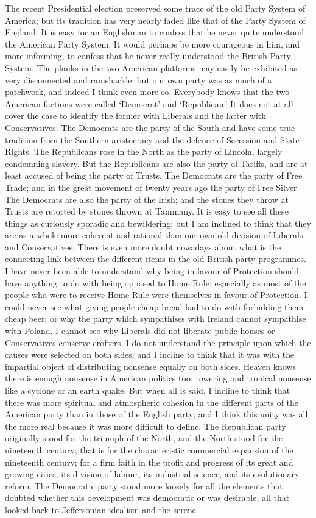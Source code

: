 \documentclass{book}
\begin{document}
The recent Presidential election preserved some trace of the old Party System of America; but its tradition has very nearly faded like that of the Party System of England. It is easy for an Englishman to confess that he never quite understood the American Party System. It would perhaps be more courageous in him, and more informing, to confess that he never really understood the British Party System. The planks in the two American platforms may easily be exhibited as very disconnected and ramshackle; but our own party was as much of a patchwork, and indeed I think even more so. Everybody knows that the two American factions were called ‘Democrat’ and ‘Republican.’ It does not at all cover the case to identify the former with Liberals and the latter with Conservatives. The Democrats are the party of the South and have some true tradition from the Southern aristocracy and the defence of Secession and State Rights. The Republicans rose in the North as the party of Lincoln, largely condemning slavery. But the Republicans are also the party of Tariffs, and are at least accused of being the party of Trusts. The Democrats are the party of Free Trade; and in the great movement of twenty years ago the party of Free Silver. The Democrats are also the party of the Irish; and the stones they throw at Trusts are retorted by stones thrown at Tammany. It is easy to see all these things as curiously sporadic and bewildering; but I am inclined to think that they are as a whole more coherent and rational than our own old division of Liberals and Conservatives. There is even more doubt nowadays about what is the connecting link between the different items in the old British party programmes. I have never been able to understand why being in favour of Protection should have anything to do with being opposed to Home Rule; especially as most of the people who were to receive Home Rule were themselves in favour of Protection. I could never see what giving people cheap bread had to do with forbidding them cheap beer; or why the party which sympathises with Ireland cannot sympathise with Poland. I cannot see why Liberals did not liberate public-houses or Conservatives conserve crofters. I do not understand the principle upon which the causes were selected on both sides; and I incline to think that it was with the impartial object of distributing nonsense equally on both sides. Heaven knows there is enough nonsense in American politics too; towering and tropical nonsense like a cyclone or an earth quake. But when all is said, I incline to think that there was more spiritual and atmospheric cohesion in the different parts of the American party than in those of the English party; and I think this unity was all the more real because it was more difficult to define. The Republican party originally stood for the triumph of the North, and the North stood for the nineteenth century; that is for the characteristic commercial expansion of the nineteenth century; for a firm faith in the profit and progress of its great and growing cities, its division of labour, its industrial science, and its evolutionary reform. The Democratic party stood more loosely for all the elements that doubted whether this development was democratic or was desirable; all that looked back to Jeffersonian idealism and the serene 
\end{document}
